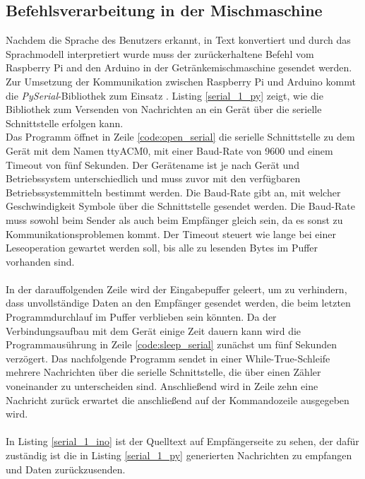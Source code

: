 \subsection{Befehlsverarbeitung in der Mischmaschine}\label{section:Befehlsverarbeitung}
Nachdem die Sprache des Benutzers erkannt, in Text konvertiert und durch das Sprachmodell interpretiert wurde muss der zurückerhaltene Befehl vom Raspberry Pi and den Arduino in der Getränkemischmaschine gesendet werden. Zur Umsetzung der Kommunikation zwischen Raspberry Pi und Arduino kommt die \textit{PySerial}-Bibliothek zum Einsatz \cite{pyserial}. Listing \ref{serial_1_py} zeigt, wie die Bibliothek zum Versenden von Nachrichten an ein Gerät über die serielle Schnittstelle erfolgen kann.\\

Das Programm öffnet in Zeile \ref{code:open_serial} die serielle Schnittstelle zu dem Gerät mit dem Namen \glqq{}ttyACM0\grqq{}, mit einer Baud-Rate von 9600 und einem Timeout von fünf Sekunden. Der Gerätename ist je nach Gerät und Betriebssystem unterschiedlich und muss zuvor mit den verfügbaren Betriebssystemmitteln bestimmt werden. Die Baud-Rate gibt an, mit welcher Geschwindigkeit Symbole über die Schnittstelle gesendet werden. Die Baud-Rate muss sowohl beim Sender als auch beim Empfänger gleich sein, da es sonst zu Kommunikationsproblemen kommt. Der Timeout steuert wie lange bei einer Leseoperation gewartet werden soll, bis alle zu lesenden Bytes im Puffer vorhanden sind.\\\\
In der darauffolgenden Zeile wird der Eingabepuffer geleert, um zu verhindern, dass unvollständige Daten an den Empfänger gesendet werden, die beim letzten Programmdurchlauf im Puffer verblieben sein könnten. Da der Verbindungsaufbau mit dem Gerät einige Zeit dauern kann wird die Programmausührung in Zeile \ref{code:sleep_serial} zunächst um fünf Sekunden verzögert. Das nachfolgende Programm sendet in einer While-True-Schleife mehrere Nachrichten über die serielle Schnittstelle, die über einen Zähler voneinander zu unterscheiden sind. Anschließend wird in Zeile zehn eine Nachricht zurück erwartet die anschließend auf der Kommandozeile ausgegeben wird.\\\\
In Listing \ref{serial_1_ino} ist der Quelltext auf Empfängerseite zu sehen, der dafür zuständig ist die in Listing \ref{serial_1_py} generierten Nachrichten zu empfangen und Daten zurückzusenden.\\
